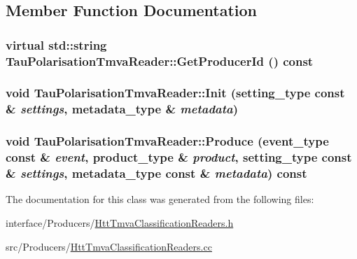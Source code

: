 \subsection{Member Function Documentation}
\hypertarget{classTauPolarisationTmvaReader_a6c12a96ffe02b1fda29fa1060312496c}{
\subsubsection[{GetProducerId}]{\setlength{\rightskip}{0pt plus 5cm}virtual std::string TauPolarisationTmvaReader::GetProducerId () const}}
\label{classTauPolarisationTmvaReader_a6c12a96ffe02b1fda29fa1060312496c}
\hypertarget{classTauPolarisationTmvaReader_a3ee9dcc6997a4c873aa516a626d2b9e1}{
\subsubsection[{Init}]{\setlength{\rightskip}{0pt plus 5cm}void TauPolarisationTmvaReader::Init (setting\_\-type const \& {\em settings}, \/  metadata\_\-type \& {\em metadata})}}
\label{classTauPolarisationTmvaReader_a3ee9dcc6997a4c873aa516a626d2b9e1}
\hypertarget{classTauPolarisationTmvaReader_abcee9b0dd083c969f2597401c8a56e1d}{
\subsubsection[{Produce}]{\setlength{\rightskip}{0pt plus 5cm}void TauPolarisationTmvaReader::Produce (event\_\-type const \& {\em event}, \/  product\_\-type \& {\em product}, \/  setting\_\-type const \& {\em settings}, \/  metadata\_\-type const \& {\em metadata}) const}}
\label{classTauPolarisationTmvaReader_abcee9b0dd083c969f2597401c8a56e1d}


The documentation for this class was generated from the following files:\begin{DoxyCompactItemize}
\item 
interface/Producers/\hyperlink{HttTmvaClassificationReaders_8h}{HttTmvaClassificationReaders.h}\item 
src/Producers/\hyperlink{HttTmvaClassificationReaders_8cc}{HttTmvaClassificationReaders.cc}\end{DoxyCompactItemize}
